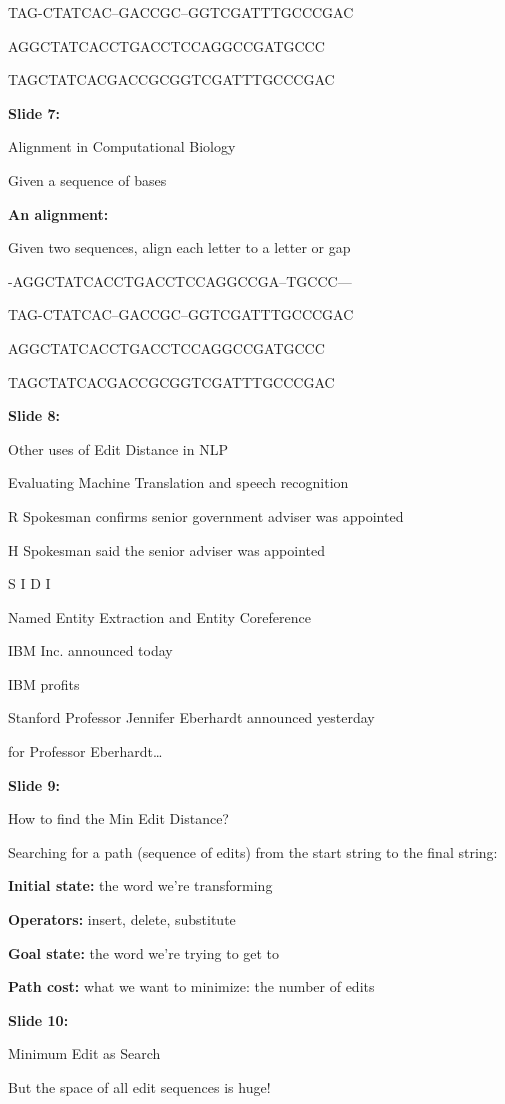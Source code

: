 \documentclass[11pt,a4paper]{article}
\begin{document}
TAG-CTATCAC--GACCGC--GGTCGATTTGCCCGAC

AGGCTATCACCTGACCTCCAGGCCGATGCCC

TAGCTATCACGACCGCGGTCGATTTGCCCGAC

\textbf{Slide 7:}

Alignment in Computational Biology

Given a sequence of bases

\textbf{An alignment:} 

Given two sequences, align each letter to a letter or gap

-AGGCTATCACCTGACCTCCAGGCCGA--TGCCC---

TAG-CTATCAC--GACCGC--GGTCGATTTGCCCGAC

AGGCTATCACCTGACCTCCAGGCCGATGCCC

TAGCTATCACGACCGCGGTCGATTTGCCCGAC

\textbf{Slide 8:}

Other uses of Edit Distance in NLP

Evaluating Machine Translation and speech recognition

R Spokesman confirms    senior government adviser was appointed

H Spokesman said    the senior            adviser was appointed

S      I              D                        I

Named Entity Extraction and Entity Coreference

IBM Inc. announced today

IBM profits

Stanford Professor Jennifer Eberhardt announced yesterday

for Professor Eberhardt…

\textbf{Slide 9:}

How to find the Min Edit Distance?

Searching for a path (sequence of edits) from the start string to the final string:

\textbf{Initial state:}  the word we’re transforming

\textbf{Operators:}  insert, delete, substitute

\textbf{Goal state:}   the word we’re trying to get to

\textbf{Path cost:}  what we want to minimize: the number of edits

\textbf{Slide 10:}

Minimum Edit as Search

But the space of all edit sequences is huge!
\end{document}
